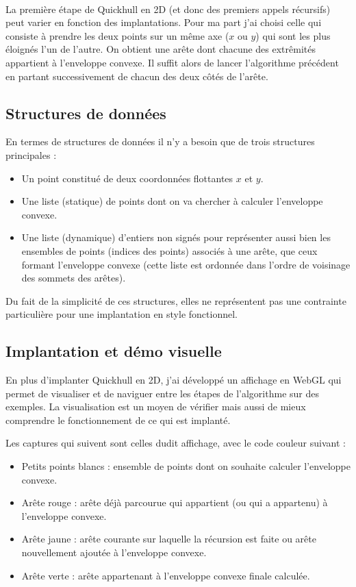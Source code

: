 \documentclass[]{article}
\begin{document}
\paragraph{}
La première étape de Quickhull en 2D (et donc des premiers appels récursifs) peut varier en fonction des implantations. Pour ma part j'ai choisi celle qui consiste à prendre les deux points sur un même axe ($x$ ou $y$) qui sont les plus éloignés l'un de l'autre. On obtient une arête dont chacune des extrêmités appartient à l'enveloppe convexe. Il suffit alors de lancer l'algorithme précédent en partant successivement de chacun des deux côtés de l'arête.

\subsection{Structures de données}
En termes de structures de données il n'y a besoin que de trois structures principales :
\begin{itemize}
	\item Un point constitué de deux coordonnées flottantes $x$ et $y$.
	\item Une liste (statique) de points dont on va chercher à calculer l'enveloppe convexe.
	\item Une liste (dynamique) d'entiers non signés pour représenter aussi bien les ensembles de points (indices des points) associés à une arête, que ceux formant l'enveloppe convexe (cette liste est ordonnée dans l'ordre de voisinage des sommets des arêtes).
\end{itemize}

Du fait de la simplicité de ces structures, elles ne représentent pas une contrainte particulière pour une implantation en style fonctionnel.

\subsection{Implantation et démo visuelle}
En plus d'implanter Quickhull en 2D, j'ai développé un affichage en WebGL qui permet de visualiser et de naviguer entre les étapes de l'algorithme sur des exemples. La visualisation est un moyen de vérifier mais aussi de mieux comprendre le fonctionnement de ce qui est implanté.

Les captures qui suivent sont celles dudit affichage, avec le code couleur suivant :
\begin{itemize}
	\item Petits points blancs : ensemble de points dont on souhaite calculer l'enveloppe convexe.
	\item Arête rouge : arête déjà parcourue qui appartient (ou qui a appartenu) à l'enveloppe convexe.
	\item Arête jaune : arête courante sur laquelle la récursion est faite ou arête nouvellement ajoutée à l'enveloppe convexe.
	\item Arête verte : arête appartenant à l'enveloppe convexe finale calculée.
\end{itemize}
\end{document}
